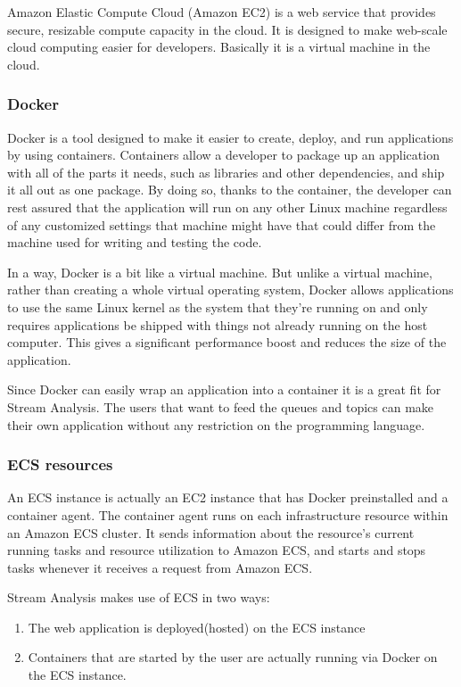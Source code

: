 Amazon Elastic Compute Cloud (Amazon EC2) is a web service that provides secure, resizable compute capacity in the cloud. It is designed to make web-scale cloud computing easier for developers.\cite{aws-ec2} Basically it is a virtual machine in the cloud.

\subsubsection{Docker}
\label{chap:04:03:01:02}

Docker is a tool designed to make it easier to create, deploy, and run applications by using containers. Containers allow a developer to package up an application with all of the parts it needs, such as libraries and other dependencies, and ship it all out as one package. By doing so, thanks to the container, the developer can rest assured that the application will run on any other Linux machine regardless of any customized settings that machine might have that could differ from the machine used for writing and testing the code.\cite{docker-description}

In a way, Docker is a bit like a virtual machine. But unlike a virtual machine, rather than creating a whole virtual operating system, Docker allows applications to use the same Linux kernel as the system that they're running on and only requires applications be shipped with things not already running on the host computer. This gives a significant performance boost and reduces the size of the application.\cite{docker-description}

Since Docker can easily wrap an application into a container it is a great fit for Stream Analysis. The users that want to feed the queues and topics can make their own application without any restriction on the programming language. 

\subsubsection{ECS resources}
\label{chap:04:03:01:03}

An ECS instance is actually an EC2 instance that has Docker preinstalled and a container agent. The container agent runs on each infrastructure resource within an Amazon ECS cluster. It sends information about the resource's current running tasks and resource utilization to Amazon ECS, and starts and stops tasks whenever it receives a request from Amazon ECS.

Stream Analysis makes use of ECS in two ways:
\begin{enumerate}
	\item The web application is deployed(hosted) on the ECS instance
	\item Containers that are started by the user are actually running via Docker on the ECS instance.
\end{enumerate}

